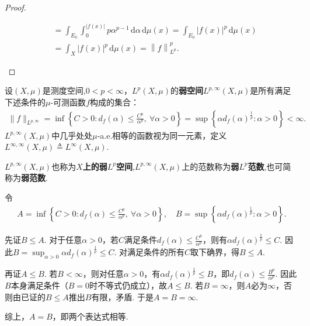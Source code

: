 \documentclass[../../main.tex]{subfiles}%
\begin{document}
\begin{proof}
\begin{enumerate}[(1)]
\begin{align*}
&=\int_{E_0}{\int_0^{\left| f\left( x \right) \right|}{p\alpha ^{p-1}\,\mathrm{d}\alpha \,\mathrm{d}\mu \left( x \right)}}=\int_{E_0}{\left| f\left( x \right) \right|^p\,\mathrm{d}\mu \left( x \right)}\\
&=\int_X{\left| f\left( x \right) \right|^p\,\mathrm{d}\mu \left( x \right)}=\left\| f \right\| _{L^p}^{p}.
\end{align*}
\end{enumerate}
\end{proof}

\begin{definition}
设$(X,\mu)$是测度空间,$0<p<\infty$，$L^{p}(X,\mu)$的\textbf{弱空间}$L^{p,\infty}(X,\mu)$是所有满足下述条件的$\mu$-可测函数$f$构成的集合：
\begin{align}
\|f\|_{L^{p,\infty}} = \inf\left\{C>0: d_f(\alpha)\leqslant \frac{C^p}{\alpha^p},\ \forall \alpha>0\right\}
= \sup\left\{\alpha d_f(\alpha)^{\frac{1}{p}}: \alpha>0\right\}<\infty.
\label{eq:weak-lp-def-2}
\end{align}
$L^{p,\infty}(X,\mu)$中几乎处处$\mu$-a.e.相等的函数视为同一元素，定义$L^{\infty,\infty}(X,\mu)\triangleq L^\infty(X,\mu)$.

$L^{p,\infty}(X,\mu)$也称为\textbf{$X$上的弱$L^p$空间},$L^{p,\infty}(X,\mu)$上的范数称为\textbf{弱}$L^p$\textbf{范数},也可简称为\textbf{弱范数}.
\end{definition}
\begin{remark}
令
\begin{align*}
A =\inf\left\{C>0: d_f(\alpha)\leqslant \frac{C^p}{\alpha^p},\ \forall \alpha>0\right\},\quad 
B =\sup\left\{\alpha d_f(\alpha)^{\frac{1}{p}}: \alpha>0\right\}.
\end{align*}

先证$B\leqslant A$. 对于任意$\alpha>0$，若$C$满足条件$d_f(\alpha)\leqslant \frac{C^p}{\alpha^p}$，则有$\alpha d_f(\alpha)^{\frac{1}{p}}\leqslant C$. 因此$B=\sup_{\alpha>0}\alpha d_f(\alpha)^{\frac{1}{p}}\leqslant C$. 对满足条件的所有$C$取下确界，得$B\leqslant A$.

再证$A\leqslant B$. 若$B<\infty$，则对任意$\alpha>0$，有$\alpha d_f(\alpha)^{\frac{1}{p}}\leqslant B$，即$d_f(\alpha)\leqslant \frac{B^p}{\alpha^p}$. 因此$B$本身满足条件（$B=0$时不等式仍成立），故$A\leqslant B$. 若$B=\infty$，则$A$必为$\infty$，否则由已证的$B\leqslant A$推出$B$有限，矛盾. 于是$A=B=\infty$.

综上，$A=B$，即两个表达式相等.
\end{remark}
\end{document}
